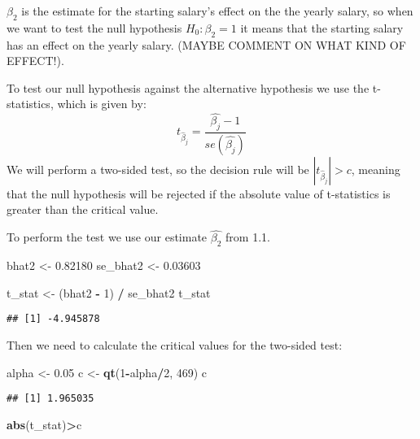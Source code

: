 \documentclass[
]{article}
\newenvironment{Shaded}{\begin{snugshade}}{\end{snugshade}}
\newcommand{\DecValTok}[1]{\textcolor[rgb]{0.00,0.00,0.81}{#1}}
\newcommand{\FloatTok}[1]{\textcolor[rgb]{0.00,0.00,0.81}{#1}}
\newcommand{\FunctionTok}[1]{\textcolor[rgb]{0.13,0.29,0.53}{\textbf{#1}}}
\newcommand{\NormalTok}[1]{#1}
\newcommand{\OtherTok}[1]{\textcolor[rgb]{0.56,0.35,0.01}{#1}}
\newcommand{\SpecialCharTok}[1]{\textcolor[rgb]{0.81,0.36,0.00}{\textbf{#1}}}
\begin{document}
\(\beta_2\) is the estimate for the starting salary's effect on the the
yearly salary, so when we want to test the null hypothesis
\(H_0:\beta_2 = 1\) it means that the starting salary has an effect on
the yearly salary. (MAYBE COMMENT ON WHAT KIND OF EFFECT!).

To test our null hypothesis against the alternative hypothesis we use
the t-statistics, which is given by:
\[t_{{\hat\beta}_j}=\frac{\hat{\beta_j}-1}{se(\hat{\beta_j})}\] We will
perform a two-sided test, so the decision rule will be
\(|t_{{\hat\beta}_j}|>c\), meaning that the null hypothesis will be
rejected if the absolute value of t-statistics is greater than the
critical value.

To perform the test we use our estimate \(\hat{\beta_2}\) from 1.1.

\begin{Shaded}
\begin{Highlighting}[]
\NormalTok{bhat2 }\OtherTok{\textless{}{-}} \FloatTok{0.82180}
\NormalTok{se\_bhat2 }\OtherTok{\textless{}{-}} \FloatTok{0.03603}

\NormalTok{t\_stat }\OtherTok{\textless{}{-}}\NormalTok{ (bhat2 }\SpecialCharTok{{-}} \DecValTok{1}\NormalTok{) }\SpecialCharTok{/}\NormalTok{ se\_bhat2}
\NormalTok{t\_stat}
\end{Highlighting}
\end{Shaded}

\begin{verbatim}
## [1] -4.945878
\end{verbatim}

Then we need to calculate the critical values for the two-sided test:

\begin{Shaded}
\begin{Highlighting}[]
\NormalTok{alpha }\OtherTok{\textless{}{-}} \FloatTok{0.05}
\NormalTok{c }\OtherTok{\textless{}{-}} \FunctionTok{qt}\NormalTok{(}\DecValTok{1}\SpecialCharTok{{-}}\NormalTok{alpha}\SpecialCharTok{/}\DecValTok{2}\NormalTok{, }\DecValTok{469}\NormalTok{)}
\NormalTok{c}
\end{Highlighting}
\end{Shaded}

\begin{verbatim}
## [1] 1.965035
\end{verbatim}

\begin{Shaded}
\begin{Highlighting}[]
\FunctionTok{abs}\NormalTok{(t\_stat)}\SpecialCharTok{\textgreater{}}\NormalTok{c}
\end{Highlighting}
\end{Shaded}
\end{document}
